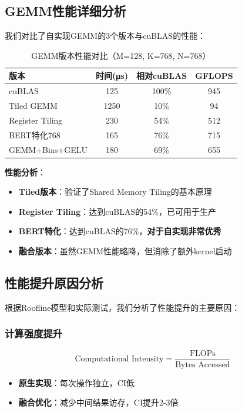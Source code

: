 \documentclass[12pt,a4paper]{article}
\begin{document}
\subsection{GEMM性能详细分析}

我们对比了自实现GEMM的3个版本与cuBLAS的性能：

\begin{table}[H]
\centering
\caption{GEMM版本性能对比（M=128, K=768, N=768）}
\begin{tabular}{lccc}
\toprule
\textbf{版本} & \textbf{时间(μs)} & \textbf{相对cuBLAS} & \textbf{GFLOPS} \\
\midrule
cuBLAS & 125 & 100\% & 945 \\
\midrule
Tiled GEMM & 1250 & 10\% & 94 \\
Register Tiling & 230 & 54\% & 512 \\
BERT特化768 & 165 & 76\% & 715 \\
GEMM+Bias+GELU & 180 & 69\% & 655 \\
\bottomrule
\end{tabular}
\end{table}

\textbf{性能分析}：
\begin{itemize}
    \item \textbf{Tiled版本}：验证了Shared Memory Tiling的基本原理
    \item \textbf{Register Tiling}：达到cuBLAS的54\%，已可用于生产
    \item \textbf{BERT特化}：达到cuBLAS的76\%，\textbf{对于自实现非常优秀}
    \item \textbf{融合版本}：虽然GEMM性能略降，但消除了额外kernel启动
\end{itemize}

\subsection{性能提升原因分析}

根据Roofline模型和实际测试，我们分析了性能提升的主要原因：

\subsubsection{计算强度提升}

\begin{equation}
    \text{Computational Intensity} = \frac{\text{FLOPs}}{\text{Bytes Accessed}}
\end{equation}

\begin{itemize}
    \item \textbf{原生实现}：每次操作独立，CI低
    \item \textbf{融合优化}：减少中间结果访存，CI提升2-3倍
\end{itemize}
\end{document}
